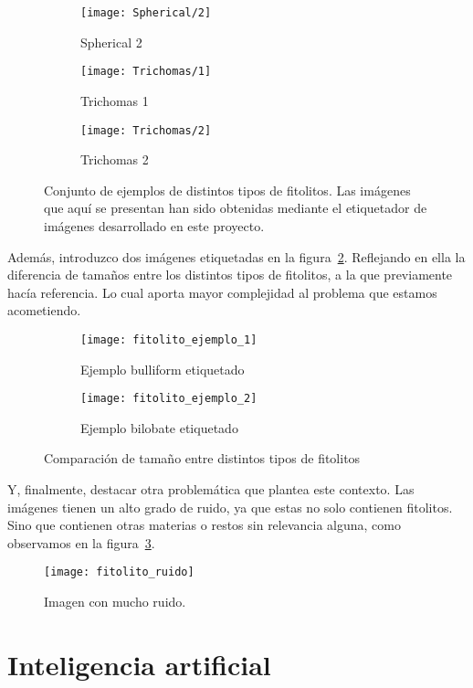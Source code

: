 \begin{figure}
\begin{subfigure}[b]{0.2\textwidth}
        \texttt{[image: Spherical/2]}
        \caption{Spherical 2}
    \end{subfigure}
    \begin{subfigure}[b]{0.2\textwidth}
        \texttt{[image: Trichomas/1]}
        \caption{Trichomas 1}
    \end{subfigure}
    \begin{subfigure}[b]{0.2\textwidth}
        \texttt{[image: Trichomas/2]}
        \caption{Trichomas 2}
    \end{subfigure}
    \caption[Conjunto de ejemplos de distintos tipos de fitolitos.]{Conjunto de ejemplos de distintos tipos de fitolitos. Las imágenes que aquí se presentan han sido obtenidas mediante el etiquetador de imágenes desarrollado en este proyecto.}
	\label{fig:3.1.1}
\end{figure}

Además, introduzco dos imágenes etiquetadas en la figura~\ref{fig:3.1.2}. Reflejando en ella la diferencia de tamaños entre los distintos tipos de fitolitos, a la que previamente hacía referencia. Lo cual aporta mayor complejidad al problema que estamos acometiendo. 

\begin{figure}
	\centering
	\begin{subfigure}[b]{0.8\textwidth}
        \texttt{[image: fitolito\_ejemplo\_1]}
        \caption{Ejemplo bulliform etiquetado}
    \end{subfigure}
    \begin{subfigure}[b]{0.8\textwidth}
        \texttt{[image: fitolito\_ejemplo\_2]}
        \caption{Ejemplo bilobate etiquetado}
    \end{subfigure}
    \caption{Comparación de tamaño entre distintos tipos de fitolitos}
	\label{fig:3.1.2}
\end{figure}

Y, finalmente, destacar otra problemática que plantea este contexto. Las imágenes tienen un alto grado de ruido, ya que estas no solo contienen  fitolitos. Sino que contienen otras materias o restos sin relevancia alguna, como observamos en la figura~\ref{fig:3.1.3}.

\begin{figure}
\centering
\texttt{[image: fitolito\_ruido]}
\caption{Imagen con mucho ruido.}
\label{fig:3.1.3}
\end{figure}

\section{Inteligencia artificial}

